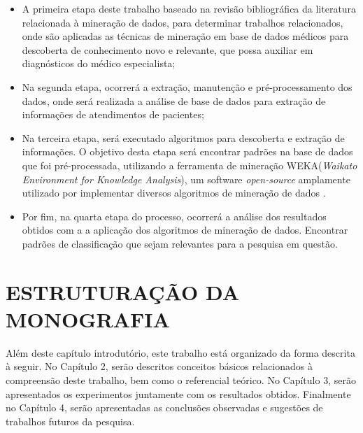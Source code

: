 \documentclass[
	12pt,				%
	openright,			%
	oneside,	
	a4paper,				%
	english,				%
	brazil				%
]{abntex2/abntex2} %
\begin{document}
		\begin{itemize}
			
			\item A primeira etapa deste trabalho baseado na revisão bibliográfica da literatura relacionada à mineração de dados, para determinar trabalhos relacionados, onde são aplicadas as técnicas de mineração em base de dados médicos para descoberta de conhecimento novo e relevante, que possa auxiliar em diagnósticos do médico especialista;
			
			\item Na segunda etapa, ocorrerá a extração, manutenção e pré-processamento dos dados, onde será realizada a análise  de base de dados para extração de informações de atendimentos de pacientes;
			
			\item Na terceira etapa, será executado algoritmos para descoberta e extração de informações. O objetivo desta etapa será encontrar padrões na base de dados que foi pré-processada, utilizando a ferramenta de mineração WEKA(\textit{Waikato Environment for Knowledge Analysis}), um software \textit{open-source} \cite{opensource:2015} amplamente utilizado por implementar diversos algoritmos de mineração de dados \cite{hall:2009}.
			
			
			\item Por fim,  na quarta etapa do processo, ocorrerá a análise dos resultados obtidos com a a aplicação dos algoritmos de mineração de dados. Encontrar padrões de classificação que sejam relevantes para a pesquisa em questão.
			
		\end{itemize}
	
	\newpage
	\section{ESTRUTURAÇÃO DA MONOGRAFIA}
	
		Além deste capítulo introdutório, este trabalho está organizado da forma descrita à seguir. No Capítulo 2, serão descritos conceitos básicos relacionados à compreensão deste trabalho, bem como o referencial teórico. No Capítulo 3, serão apresentados os experimentos juntamente com os resultados obtidos. Finalmente no Capítulo 4, serão apresentadas as conclusões observadas e sugestões de trabalhos futuros da pesquisa.
\end{document}
